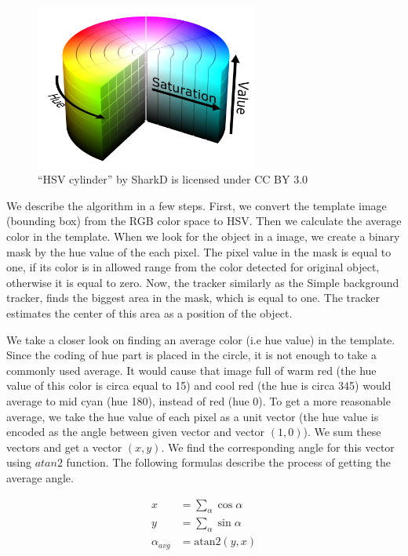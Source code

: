 \begin{figure}[h!]\centering
\includegraphics[width=0.65\textwidth]{img/hsv-cylinder.png}
\caption[``HSV cylinder'' by SharkD is licensed under CC BY 3.0]{``HSV cylinder'' by SharkD is licensed under CC BY 3.0 \protect\footnotemark}
\end{figure}

We describe the algorithm in a few steps. First, we convert the template image
(bounding box) from the RGB color space to HSV. Then we calculate the average
color in the template. When we look for the object in a image, we create a
binary mask by the hue value of the each pixel. The pixel value in the mask is
equal to one, if its color is in allowed range from the color detected for
original object, otherwise it is equal to zero. Now, the tracker similarly as
the Simple background tracker, finds the biggest area in the mask, which is equal to
one. The tracker estimates the center of this area as a position of the object.

We take a closer look on finding an average color (i.e hue value) in the
template.  Since the coding of hue part is placed in the circle, it is not
enough to take a commonly used average. It would cause that image full of warm
red (the hue value of this color is circa equal to 15) and cool red (the hue is
circa 345) would average to mid cyan (hue 180), instead of red (hue 0). To get
a more reasonable average, we take the hue value of each pixel as a unit vector
(the hue value is encoded as the angle between given vector and vector $(1,
0)$). We sum these vectors and get a vector $(x, y)$. We find the corresponding
angle for this vector using $atan2$ function. The following formulas describe
the process of getting the average angle.

$$
\begin{aligned}
x &= \sum_\alpha \cos \alpha \\
y &= \sum_\alpha \sin \alpha \\
\alpha_{avg} &= \text{atan2}(y, x)
\end{aligned}
$$


